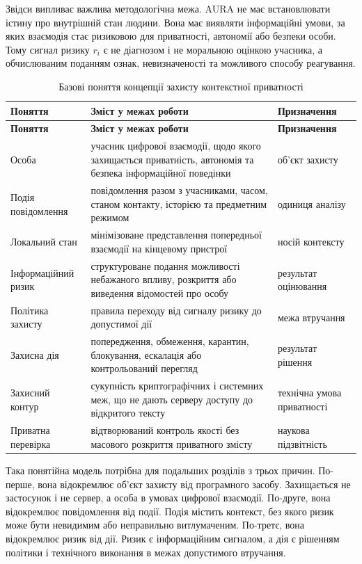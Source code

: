 Звідси випливає важлива методологічна межа. AURA не має встановлювати істину про внутрішній стан людини. Вона має виявляти інформаційні умови, за яких взаємодія стає ризиковою для приватності, автономії або безпеки особи. Тому сигнал ризику \(r_i\) є не діагнозом і не моральною оцінкою учасника, а обчислюваним поданням ознак, невизначеності та можливого способу реагування.

\begin{longtable}{p{3.6cm} p{6.7cm} p{2.8cm}}
\caption{Базові поняття концепції захисту контекстної приватності}
\label{tab:conceptual-terms}\\
\toprule
\textbf{Поняття} & \textbf{Зміст у межах роботи} & \textbf{Призначення} \\
\midrule
\endfirsthead
\toprule
\textbf{Поняття} & \textbf{Зміст у межах роботи} & \textbf{Призначення} \\
\midrule
\endhead
Особа & учасник цифрової взаємодії, щодо якого захищається приватність, автономія та безпека інформаційної поведінки & об'єкт захисту \\
Подія повідомлення & повідомлення разом з учасниками, часом, станом контакту, історією та предметним режимом & одиниця аналізу \\
Локальний стан & мінімізоване представлення попередньої взаємодії на кінцевому пристрої & носій контексту \\
Інформаційний ризик & структуроване подання можливості небажаного впливу, розкриття або виведення відомостей про особу & результат оцінювання \\
Політика захисту & правила переходу від сигналу ризику до допустимої дії & межа втручання \\
Захисна дія & попередження, обмеження, карантин, блокування, ескалація або контрольований перегляд & результат рішення \\
Захисний контур & сукупність криптографічних і системних меж, що не дають серверу доступу до відкритого тексту & технічна умова приватності \\
Приватна перевірка & відтворюваний контроль якості без масового розкриття приватного змісту & наукова підзвітність \\
\bottomrule
\end{longtable}

Така понятійна модель потрібна для подальших розділів з трьох причин. По-перше, вона відокремлює об'єкт захисту від програмного засобу. Захищається не застосунок і не сервер, а особа в умовах цифрової взаємодії. По-друге, вона відокремлює повідомлення від події. Подія містить контекст, без якого ризик може бути невидимим або неправильно витлумаченим. По-третє, вона відокремлює ризик від дії. Ризик є інформаційним сигналом, а дія є рішенням політики і технічного виконання в межах допустимого втручання.

